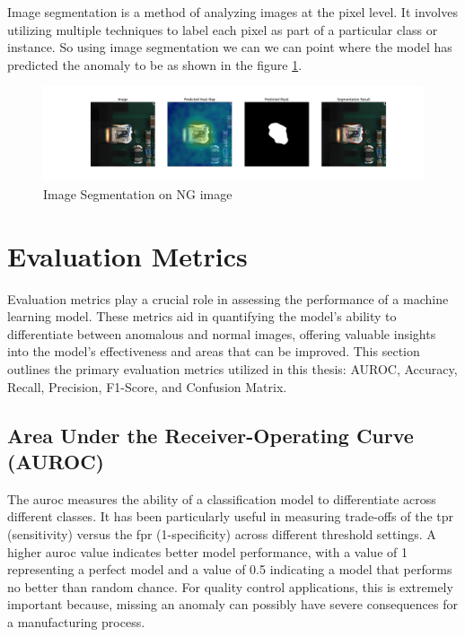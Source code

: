 Image segmentation is a method of analyzing images at the pixel level. It involves utilizing multiple techniques to label each pixel as part of a particular class or instance\cite{IBM2024}. So using image segmentation we can we can point where the model has predicted the anomaly to be as shown in the figure \ref{fig:Image Segmentation on NG image}.

\begin{figure}[ht!]
    \centering
    \includegraphics[width=1\linewidth]{Images/anomalous_image_segmentation.jpg}
    \caption{Image Segmentation on NG image}
    \label{fig:Image Segmentation on NG image}
\end{figure}

\section{Evaluation Metrics}
\label{subsec:Evaluation Metrics}

Evaluation metrics play a crucial role in assessing the performance of a machine learning model. These metrics aid in quantifying the model's ability to differentiate between anomalous and normal images, offering valuable insights into the model's effectiveness and areas that can be improved. This section outlines the primary evaluation metrics utilized in this thesis: AUROC, Accuracy, Recall, Precision, F1-Score, and Confusion Matrix.

\subsection*{Area Under the Receiver-Operating Curve (AUROC)}
\label{subsec:AUROC}

The \gls{auroc} measures the ability of a classification model to differentiate across different classes. It has been particularly useful in measuring trade-offs of the \gls{tpr} (sensitivity) versus the \gls{fpr} (1-specificity) across different threshold settings. A higher \gls{auroc} value indicates better model performance, with a value of 1 representing a perfect model and a value of 0.5 indicating a model that performs no better than random chance\cite{FAWCETT2006861}. For quality control applications, this is extremely important because, missing an anomaly can possibly have severe consequences for a manufacturing process. %

